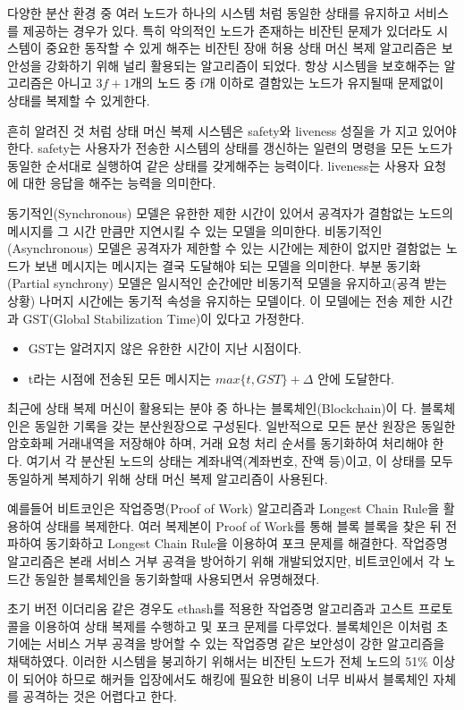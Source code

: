 다양한 분산 환경 중 여러 노드가 하나의 시스템 처럼
동일한 상태를 유지하고 서비스를 제공하는 경우가 있다.
특히 악의적인 노드가 존재하는 비잔틴 문제가 있더라도 시스템이
중요한 동작할 수 있게 해주는 비잔틴 장애 허용 상태 머신 복제 알고리즘은
보안성을 강화하기 위해 널리 활용되는 알고리즘이 되었다.
항상 시스템을 보호해주는 알고리즘은 아니고 \(3f+1\)개의 노드 중 f개 이하로 
결함있는 노드가 유지될때 문제없이 상태를 복제할 수 있게한다.

흔히 알려진 것 처럼 상태 머신 복제 시스템은 safety와 liveness 성질을 가
지고 있어야 한다. safety는 사용자가 전송한 시스템의 상태를 갱신하는 일련의
명령을 모든 노드가 동일한 순서대로 실행하여 같은 상태를 갖게해주는 능력이다.
liveness는 사용자 요청에 대한 응답을 해주는 능력을 의미한다.

동기적인(Synchronous) 모델은 유한한 제한 시간이 있어서 공격자가 결함없는 노드의 메시지를
그 시간 만큼만 지연시킬 수 있는 모델을 의미한다.
비동기적인(Asynchronous) 모델은 공격자가 제한할 수 있는 시간에는 제한이 없지만 
결함없는 노드가 보낸 메시지는 메시지는 결국 도달해야 되는 모델을 의미한다.
부분 동기화(Partial synchrony) 모델은 일시적인 순간에만 비동기적 모델을 유지하고(공격 받는 상황) 나머지 시간에는 동기적
속성을 유지하는 모델이다. 이 모델에는 전송 제한 시간과 GST(Global Stabilization Time)이 있다고 가정한다.

\begin{itemize}
  \item GST는 알려지지 않은 유한한 시간이 지난 시점이다.
  \item t라는 시점에 전송된 모든 메시지는 \(max\{t,GST\}+\Delta\) 안에 도달한다.
\end{itemize}


최근에 상태 복제 머신이 활용되는 분야 중 하나는 블록체인(Blockchain)이
다. 블록체인은 동일한 기록을 갖는 분산원장으로 구성된다. 일반적으로 모든
분산 원장은 동일한 암호화페 거래내역을 저장해야 하며, 거래 요청 처리 순서를
동기화하여 처리해야 한다. 여기서 각 분산된 노드의 상태는 계좌내역(계좌번호,
잔액 등)이고, 이 상태를 모두 동일하게 복제하기 위해 상태 머신 복제 알고리즘이
사용된다.

예를들어 비트코인은 작업증명(Proof of Work) 알고리즘과 Longest Chain
Rule을 활용하여 상태를 복제한다. 여러 복제본이 Proof of Work를 통해 블록 블록을
찾은 뒤 전파하여 동기화하고 Longest Chain Rule을 이용하여 포크 문제를 해결한다.
작업증명 알고리즘은 본래 서비스 거부 공격을 방어하기 위해 개발되었지만, 
비트코인에서 각 노드간 동일한 블록체인을 동기화할때 사용되면서 유명해졌다.

초기 버전 이더리움 같은 경우도 ethash를 적용한 작업증명 알고리즘과 고스트 프로토콜을
이용하여 상태 복제를 수행하고 및 포크 문제를 다루었다. 블록체인은 이처럼 초기에는 
서비스 거부 공격을 방어할 수 있는 작업증명 같은 보안성이 강한 알고리즘을 채택하였다.
이러한 시스템을 붕괴하기 위해서는 비잔틴 노드가 전체 노드의 51\% 이상이 되어야 하므로
해커들 입장에서도 해킹에 필요한 비용이 너무 비싸서 블록체인 자체를 공격하는 것은
어렵다고 한다.

